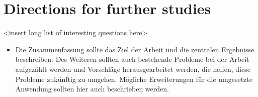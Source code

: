 
\section{Directions for further studies}
\label{sec:further-studies}
<insert long list of interesting questions here>

\begin{itemize}
	\item Die Zusammenfassung sollte das Ziel der Arbeit und die zentralen Ergebnisse beschreiben. Des Weiteren sollten auch bestehende Probleme bei der Arbeit aufgezählt werden und Vorschläge herausgearbeitet werden, die helfen, diese Probleme zukünftig zu umgehen. Mögliche Erweiterungen für die umgesetzte Anwendung sollten hier auch beschrieben werden.
\end{itemize}

